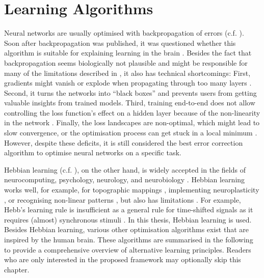\section{Learning Algorithms}
Neural networks are usually optimised with backpropagation of errors (c.f. ).
Soon after backpropagation was published, it was questioned whether this algorithm is suitable for explaining learning in the brain .
Besides the fact that backpropagation seems biologically not plausible and might be responsible for many of the limitations described in , it also has technical shortcomings:
First, gradients might vanish or explode when propagating through too many layers .
Second, it turns the networks into ``black boxes'' and prevents users from getting valuable insights from trained models.
Third, training end-to-end does not allow controlling the loss function's effect on a hidden layer because of the non-linearity in the network .
Finally, the loss landscapes are non-optimal, which might lead to slow convergence, or the optimisation process can get stuck in a local minimum  .
However, despite these deficits, it is still considered the best error correction algorithm to optimise neural networks on a specific task. 

Hebbian learning (c.f. ), on the other hand, is widely accepted in the fields of neurocomputing, psychology, neurology, and neurobiology .
Hebbian learning works well, for example, for topographic mappings , implementing neuroplasticity , or recognising non-linear patterns , but also has limitations \cite{anderson_biased_1998}.
For example, Hebb's learning rule is insufficient as a general rule for time-shifted signals as it requires (almost) synchronous stimuli .
In this thesis, Hebbian learning is used.
Besides Hebbian learning, various other optimisation algorithms exist that are inspired by the human brain. These algorithms are summarised in the following to provide a comprehensive overview of alternative learning principles. Readers who are only interested in the proposed framework may optionally skip this chapter.


